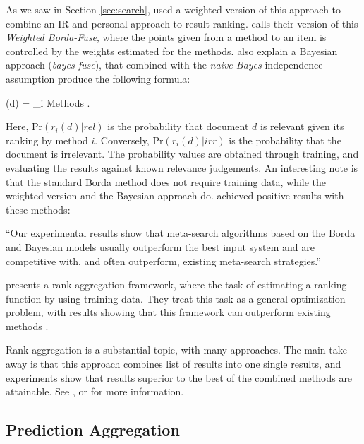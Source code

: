 As we saw in Section \ref{sec:search}, \citet[p.3]{Xu2008} used a weighted version
of this approach to combine an IR and personal approach to result ranking.
\citet[p.3]{Aslam2001} calls their version of this \emph{Weighted Borda-Fuse},
where the points given from a method to an item is controlled
by the weights estimated for the methods.
\citet[p.4]{Aslam2001} also explain a Bayesian approach (\emph{bayes-fuse}),
that combined with the \emph{naive Bayes} independence assumption 
produce the following formula:

\begin{eqsp}
  (d)  = \sum_{i \in Methods} \log 
    .
\end{eqsp}

Here, $\mathrm{Pr}(r_i(d) | rel)$ is the probability that document $d$
is relevant given its ranking by method $i$.
Conversely, $\mathrm{Pr}(r_i(d) | irr)$ is the probability that the document 
is irrelevant. The probability values are obtained through training,
and evaluating the results against known relevance judgements.
An interesting note is that the standard Borda method does not require training data,
while the weighted version and the Bayesian approach do.
\citet{Aslam2001} achieved positive results with these methods:

\begin{blockquote}
``Our experimental results show that meta-search algorithms based on the 
Borda and Bayesian models usually outperform the best input system 
and are competitive with, and often outperform, 
existing meta-search strategies.''
\end{blockquote}

\cite{Liu2007} presents a rank-aggregation framework, where
the task of estimating a ranking function by using training data.
They treat this task as a general optimization problem, with results
showing that this framework can outperform existing methods \cite[p.7]{Liu2007}.

Rank aggregation is a substantial topic, with many approaches.
The main take-away is that this approach combines list of results
into one single results, and experiments show that results superior
to the best of the combined methods are attainable.
See \cite{Aslam2001}, \cite{Liu2007} or \cite{Klementiev2008} 
for more information.


\subsection{Prediction Aggregation}
\label{sec:theory:predictionagg}

